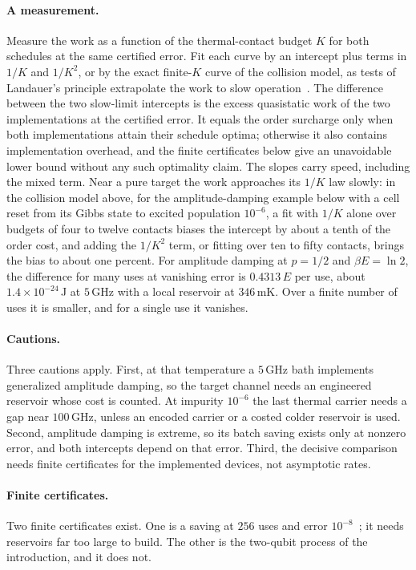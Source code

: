 \documentclass[11pt]{article}
\theoremstyle{definition}
\theoremstyle{remark}
\begin{document}
\paragraph{A measurement.} Measure the work as a function of the thermal-contact budget $K$ for both schedules at the same certified error. Fit each curve by an intercept plus terms in $1/K$ and $1/K^2$, or by the exact finite-$K$ curve of the collision model, as tests of Landauer's principle extrapolate the work to slow operation~\cite{Berut12,Jun14}. The difference between the two slow-limit intercepts is the excess quasistatic work of the two implementations at the certified error. It equals the order surcharge only when both implementations attain their schedule optima; otherwise it also contains implementation overhead, and the finite certificates below give an unavoidable lower bound without any such optimality claim. The slopes carry speed, including the mixed term. Near a pure target the work approaches its $1/K$ law slowly: in the collision model above, for the amplitude-damping example below with a cell reset from its Gibbs state to excited population $10^{-6}$, a fit with $1/K$ alone over budgets of four to twelve contacts biases the intercept by about a tenth of the order cost, and adding the $1/K^2$ term, or fitting over ten to fifty contacts, brings the bias to about one percent. For amplitude damping at $p=1/2$ and $\beta E=\ln2$, the difference for many uses at vanishing error is $0.4313\,E$ per use, about $1.4\times10^{-24}$\,J at $5$\,GHz with a local reservoir at $346$\,mK. Over a finite number of uses it is smaller, and for a single use it vanishes.

\paragraph{Cautions.} Three cautions apply. First, at that temperature a $5$\,GHz bath implements generalized amplitude damping, so the target channel needs an engineered reservoir whose cost is counted. At impurity $10^{-6}$ the last thermal carrier needs a gap near $100$\,GHz, unless an encoded carrier or a costed colder reservoir is used. Second, amplitude damping is extreme, so its batch saving exists only at nonzero error, and both intercepts depend on that error. Third, the decisive comparison needs finite certificates for the implemented devices, not asymptotic rates.

\paragraph{Finite certificates.} Two finite certificates exist. One is a saving at $256$ uses and error $10^{-8}$~\cite{SaveWork}; it needs reservoirs far too large to build. The other is the two-qubit process of the introduction, and it does not.
\end{document}
